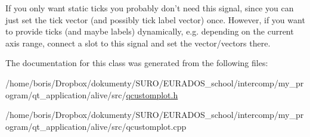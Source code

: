 If you only want static ticks you probably don't need this signal, since you can just set the tick vector (and possibly tick label vector) once. However, if you want to provide ticks (and maybe labels) dynamically, e.\-g. depending on the current axis range, connect a slot to this signal and set the vector/vectors there. 

The documentation for this class was generated from the following files\-:\begin{DoxyCompactItemize}
\item 
/home/boris/\-Dropbox/dokumenty/\-S\-U\-R\-O/\-E\-U\-R\-A\-D\-O\-S\-\_\-school/intercomp/my\-\_\-program/qt\-\_\-application/alive/src/\hyperlink{qcustomplot_8h}{qcustomplot.\-h}\item 
/home/boris/\-Dropbox/dokumenty/\-S\-U\-R\-O/\-E\-U\-R\-A\-D\-O\-S\-\_\-school/intercomp/my\-\_\-program/qt\-\_\-application/alive/src/qcustomplot.\-cpp\end{DoxyCompactItemize}
